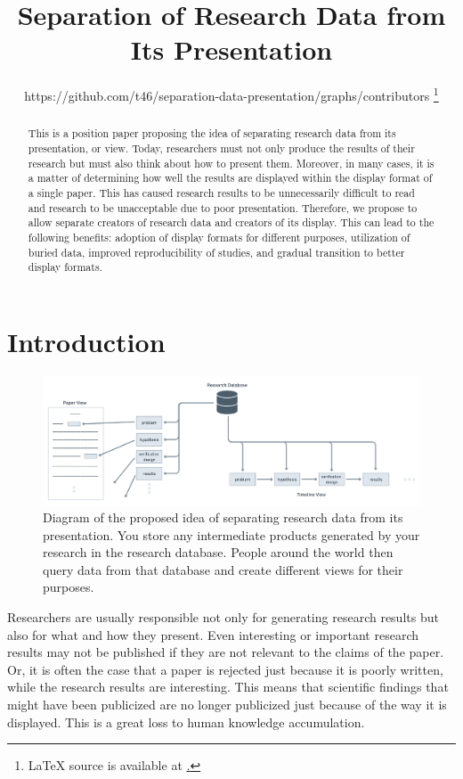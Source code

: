 \documentclass{article}
\title{Separation of Research Data from Its Presentation}
\author{%
https://github.com/t46/separation-data-presentation/graphs/contributors
\thanks{
  LaTeX source is available at 
  \href{https://github.com/t46/separation-data-presentation}.
  }
}
\begin{document}
\maketitle


\begin{abstract}
  This is a position paper proposing the idea of separating research data from its presentation, or view. Today, researchers must not only produce the results of their research but must also think about how to present them. Moreover, in many cases, it is a matter of determining how well the results are displayed within the display format of a single paper. This has caused research results to be unnecessarily difficult to read and research to be unacceptable due to poor presentation. Therefore, we propose to allow separate creators of research data and creators of its display. This can lead to the following benefits: adoption of display formats for different purposes, utilization of buried data, improved reproducibility of studies, and gradual transition to better display formats.
\end{abstract}


\section{Introduction}

\begin{figure}[htb]
    \centering
    \includegraphics[width=\linewidth]{figs/paper_as_a_view.png}
    \caption{Diagram of the proposed idea of separating research data from its presentation. You store any intermediate products generated by your research in the research database. People around the world then query data from that database and create different views for their purposes.}
    \label{fig:paper_as_a_view}
\end{figure}

Researchers are usually responsible not only for generating research results but also for what and how they present. Even interesting or important research results may not be published if they are not relevant to the claims of the paper. Or, it is often the case that a paper is rejected just because it is poorly written, while the research results are interesting. This means that scientific findings that might have been publicized are no longer publicized just because of the way it is displayed. This is a great loss to human knowledge accumulation.
\end{document}
